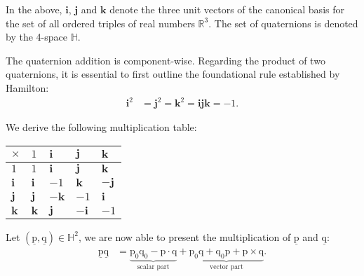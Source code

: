 \noindent In the above, $\bm{i}$, $\bm{j}$ and $\bm{k}$ denote the three unit vectors of the canonical basis for 
the set of all ordered triples of real numbers $\mathbb{R}^3$. The set of quaternions is denoted by the 4-space $\mathbb{H}$.

\bigbreak 
The quaternion addition is component-wise. Regarding the product of two quaternions, it is essential to first outline the foundational rule established by \mbox{Hamilton}:
\begin{align*}
	\bm{i}^2 &= \bm{j}^2 = \bm{k}^2 = \bm{ijk}= -1.
\end{align*}

\noindent We derive the following multiplication table:

\begin{center}
\setlength{\arrayrulewidth}{1pt}
\renewcommand{\arraystretch}{1.2}
\begin{tabular}{|m{1.5em}||m{1.5em}|m{1.5em}|m{1.5em}|m{1.5em}|}
    \hline
    \rowcolor{gray!25}
    \cellcolor{gray!60}$\times$ & \centering $1$ & \centering $\bm{i}$ & \centering $\bm{j}$ & \centering $\bm{k}$ \tabularnewline
    \hline\hline
    \cellcolor{gray!25}$1$ & \centering $1$ & \centering $\bm{i}$ & \centering $\bm{j}$ & \centering $\bm{k}$ \tabularnewline
    \hline
    \cellcolor{gray!25}$\bm{i}$ & \centering $\bm{i}$ & \centering $-1$ & \centering $\bm{k}$ & \centering $-\bm{j}$ \tabularnewline
    \hline
    \cellcolor{gray!25}$\bm{j}$ & \centering $\bm{j}$ & \centering $-\bm{k}$ & \centering $-1$ & \centering $\bm{i}$ \tabularnewline
    \hline
    \cellcolor{gray!25}$\bm{k}$ & \centering $\bm{k}$ & \centering $\bm{j}$ & \centering $-\bm{i}$ & \centering $-1$ \tabularnewline
    \hline
\end{tabular}
\end{center}

\bigbreak 

\noindent Let $(\underline{\bm{\mathrm{p}}}, \underline{\bm{\mathrm{q}}})\in\mathbb{H}^2$, we are now able to present the multiplication of $\underline{\bm{\mathrm{p}}}$ and $\underline{\bm{\mathrm{q}}}$:
\begin{align*}
    \underline{\bm{\mathrm{p}}}\underline{\bm{\mathrm{q}}} &= \underbrace{\mathrm{p}_0\mathrm{q}_0 - \bm{\mathrm{p}} \cdot \bm{\mathrm{q}}}_{\text{scalar part}} + \underbrace{\mathrm{p}_0\bm{\mathrm{q}} + \mathrm{q}_0\bm{\mathrm{p}} + \bm{\mathrm{p}} \times \bm{\mathrm{q}}}_{\text{vector part}}.
\end{align*}

